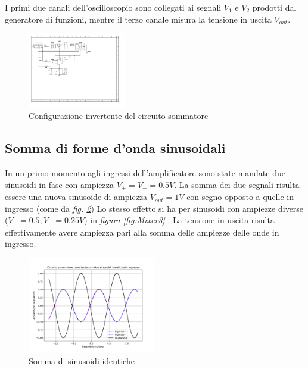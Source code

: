 \documentclass[journal]{IEEEtran}
\begin{document}
I primi due canali dell'oscilloscopio sono collegati ai segnali $V_1$ e $V_2$ prodotti dal generatore di funzioni, mentre il terzo canale misura la tensione in uscita $V_{out}$.


\begin{figure}[H]%
\begin {center}
\includegraphics[width=0.38\textwidth]{sch-simulations/output/OPA-mixer.pdf}
\caption{Configurazione invertente del circuito sommatore}
\label{fig:OPA-mixer}
\end {center}
\end{figure}
\subsection{Somma di forme d'onda sinusoidali}
In un primo momento agli ingressi dell'amplificatore sono state mandate due sinusoidi in fase con ampiezza $V_+ = V_- = 0.5 V$. La somma dei due segnali risulta essere una nuova sinusoide di ampiezza $V_{out} = 1 V$ con segno opposto a quelle in ingresso (come da \textit{fig. \ref{fig:Mixer1}})
Lo stesso effetto si ha per sinusoidi con ampiezze diverse ($V_+ = 0.5, V_- = 0.25 V$) in \textit{figura \ref{fig:Mixer3} }. La tensione in uscita risulta effettivamente avere ampiezza pari alla somma delle ampiezze delle onde in ingresso.

\begin{figure}[H]%
\begin {center}
\includegraphics[width=0.50\textwidth]{analysis/output/OPA_mixer_sin0.pdf}
\caption{Somma di sinusoidi identiche}
\label{fig:Mixer1}
\end {center}
\end{figure}
\end{document}
